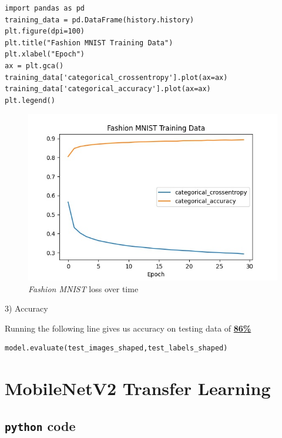 \documentclass[12pt, letterpaper]{article}
\begin{document}
\begin{mdframed}[backgroundcolor=bg]
\begin{verbatim}
import pandas as pd
training_data = pd.DataFrame(history.history)
plt.figure(dpi=100)
plt.title("Fashion MNIST Training Data")
plt.xlabel("Epoch")
ax = plt.gca()
training_data['categorical_crossentropy'].plot(ax=ax)
training_data['categorical_accuracy'].plot(ax=ax)
plt.legend()
\end{verbatim}
\end{mdframed}

\begin{figure}
\includegraphics[width=\linewidth]{colab_fashion_mnist_training.jpeg}
\caption{\textit{Fashion MNIST} loss over time}
\label{fig:fashionmnist-2}
\end{figure}

{\large 3) Accuracy}

Running the following line gives us accuracy on testing data of \underline{\textbf{86\%}}
\begin{verbatim}
model.evaluate(test_images_shaped,test_labels_shaped)
\end{verbatim}

\clearpage

\section{MobileNetV2 Transfer Learning}

\subsection{\texttt{python} code}
\end{document}

